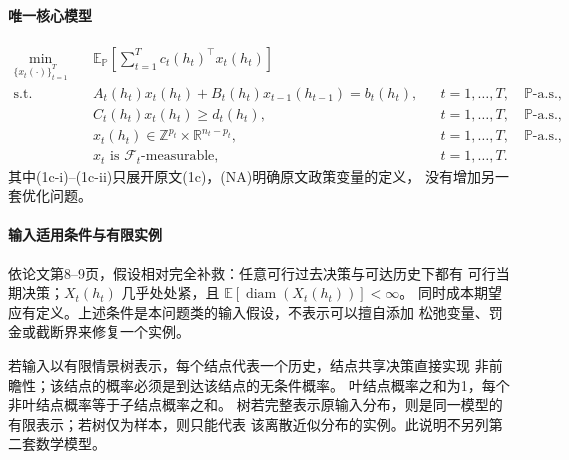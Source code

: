\documentclass[UTF8,11pt]{ctexart}
\begin{document}
\paragraph{唯一核心模型}
\begin{align}
\min_{\{x_t(\cdot)\}_{t=1}^T}\quad&
\mathbb E_{\mathbb P}\!\left[\sum_{t=1}^T c_t(h_t)^\top x_t(h_t)\right]
\tag{1a}\\
\text{s.t.}\quad& A_t(h_t)x_t(h_t)+B_t(h_t)x_{t-1}(h_{t-1})=b_t(h_t),
&&t=1,\ldots,T,\quad\mathbb P\text{-a.s.},\tag{1b}\\
&C_t(h_t)x_t(h_t)\ge d_t(h_t),
&&t=1,\ldots,T,\quad\mathbb P\text{-a.s.},\tag{1c-i}\\
&x_t(h_t)\in\mathbb Z^{p_t}\times\mathbb R^{n_t-p_t},
&&t=1,\ldots,T,\quad\mathbb P\text{-a.s.},\tag{1c-ii}\\
&x_t\text{ is }\mathcal F_t\text{-measurable},
&&t=1,\ldots,T.\tag{NA}
\end{align}
其中(1c-i)--(1c-ii)只展开原文(1c)，(NA)明确原文政策变量的定义，
没有增加另一套优化问题。

\paragraph{输入适用条件与有限实例}
依论文第8--9页，假设相对完全补救：任意可行过去决策与可达历史下都有
可行当期决策；$X_t(h_t)$ 几乎处处紧，且
$\mathbb E[\operatorname{diam}(X_t(h_t))]<\infty$。
同时成本期望应有定义。上述条件是本问题类的输入假设，不表示可以擅自添加
松弛变量、罚金或截断界来修复一个实例。

若输入以有限情景树表示，每个结点代表一个历史，结点共享决策直接实现
非前瞻性；该结点的概率必须是到达该结点的无条件概率。
叶结点概率之和为1，每个非叶结点概率等于子结点概率之和。
树若完整表示原输入分布，则是同一模型的有限表示；若树仅为样本，则只能代表
该离散近似分布的实例。此说明不另列第二套数学模型。
\end{document}
